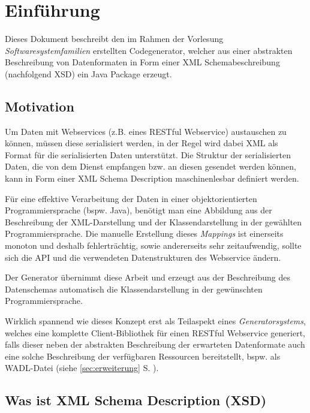\documentclass[a4paper]{scrartcl}
\author{\documentAuthor}
\date{\today}
\begin{document}
    
    \clearpage

    \tableofcontents
    \clearpage

    \section{Einführung}

    Dieses Dokument beschreibt den im Rahmen der Vorlesung \emph{Softwaresystemfamilien} erstellten Codegenerator, welcher aus einer abstrakten Beschreibung von Datenformaten in Form einer \gls{XML} Schemabeschreibung (nachfolgend \gls{XSD}) ein Java Package erzeugt.

    \subsection{Motivation}

    Um Daten mit Webservices (z.B. eines \gls{RESTful} Webservice) austauschen zu können, müssen diese serialisiert werden, in der Regel wird dabei XML als Format für die serialisierten Daten unterstützt. Die Struktur der serialisierten Daten, die von dem Dienst empfangen bzw. an diesen gesendet werden können, kann in Form einer XML Schema Description maschinenlesbar definiert werden.

    Für eine effektive Verarbeitung der Daten in einer objektorientierten Programmiersprache (bspw. Java), benötigt man eine Abbildung aus der Beschreibung der XML-Darstellung und der Klassendarstellung in der gewählten Programmiersprache. Die manuelle Erstellung dieses \emph{Mappings} ist einerseits monoton und deshalb fehlerträchtig, sowie andererseits sehr zeitaufwendig, sollte sich die API und die verwendeten Datenstrukturen des Webservice ändern.

    Der Generator übernimmt diese Arbeit und erzeugt aus der Beschreibung des Datenschemas automatisch die Klassendarstellung in der gewünschten Programmiersprache.

    Wirklich spannend wie dieses Konzept erst als Teilaspekt eines \emph{Generatorsystems}, welches eine komplette Client-Bibliothek für einen \gls{RESTful} Webservice generiert, falls dieser neben der abstrakten Beschreibung der erwarteten Datenformate auch eine solche Beschreibung der verfügbaren Ressourcen bereitstellt, bspw. als \gls{WADL}-Datei (siehe \cref{sec:erweiterung} S. \pageref{sec:erweiterung}).

    \subsection{Was ist XML Schema Description (XSD)}
\end{document}
